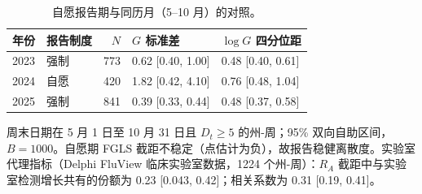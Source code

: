 \begin{table}[htbp]
\centering
\footnotesize
\caption{自愿报告期与同历月（5--10 月）的对照。}
\label{tab:s4}
\begin{tabular}{llrll}
\toprule
年份 & 报告制度 & $N$ & $G$ 标准差 & $\log G$ 四分位距 \\
\midrule
2023 & 强制 & 773 & 0.62 [0.40, 1.00] & 0.48 [0.40, 0.61] \\
2024 & 自愿 & 420 & 1.82 [0.42, 4.10] & 0.76 [0.48, 1.04] \\
2025 & 强制 & 841 & 0.39 [0.33, 0.44] & 0.48 [0.37, 0.58] \\
\bottomrule
\end{tabular}
\par\smallskip
\begin{minipage}{0.95\linewidth}\scriptsize 周末日期在 5 月 1 日至 10 月 31 日且 $D_t\ge 5$ 的州-周；95\% 双向自助区间，$B=1000$。自愿期 FGLS 截距不稳定（点估计为负），故报告稳健离散度。实验室代理指标（Delphi FluView 临床实验室数据，1224 个州-周）：$R_A$ 截距中与实验室检测增长共有的份额为 0.23 [0.043, 0.42]；相关系数为 0.31 [0.19, 0.41]。\end{minipage}
\end{table}
